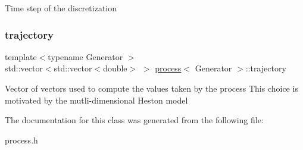 Time step of the discretization \mbox{\label{classprocess_a63939362bca6b3ee7941c7219954719c}} 
\subsubsection{\texorpdfstring{trajectory}{trajectory}}
{\footnotesize\ttfamily template$<$typename Generator $>$ \\
std\+::vector$<$std\+::vector$<$double$>$ $>$ \mbox{\hyperlink{classprocess}{process}}$<$ Generator $>$\+::trajectory\hspace{0.3cm}{\ttfamily [protected]}}

Vector of vectors used to compute the values taken by the process This choice is motivated by the mutli-\/dimensional Heston model 

The documentation for this class was generated from the following file\+:\begin{DoxyCompactItemize}
\item 
process.\+h\end{DoxyCompactItemize}
